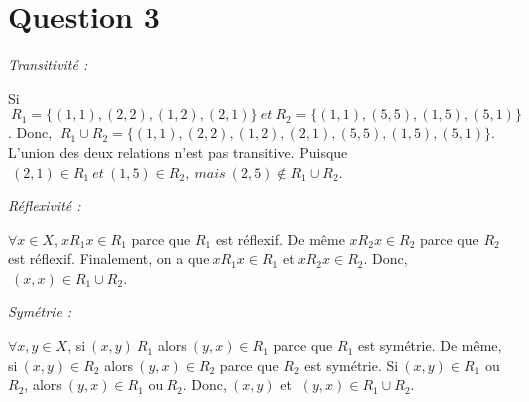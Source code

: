 \section*{Question 3}
\emph{Transitivité :}

Si$\ R_1 = \{(1,1), (2,2), (1,2), (2,1)\}\ et\ R_2 = \{(1,1), (5,5), (1,5), (5,1)\}$. Donc, $\ R_1 \cup R_2 = \{(1,1), (2,2), (1,2), (2,1), (5,5), (1,5), (5,1)\}$. L'union des  deux relations n'est pas transitive. Puisque$\ (2,1) \in R_1\ et\ (1,5) \in R_2,\ mais\ (2,5) \notin R_1 \cup R_2$.

\bigskip

\emph{Réflexivité :}

$\forall x\in X$,$\ xR_1x \in R_1$ parce que $R_1$ est réflexif. De même $xR_2x \in R_2$ parce que $R_2$ est réflexif. Finalement, on a que$\ xR_1x \in R_1$ et$\ xR_2x \in R_2$. Donc,$\ (x,x) \in R_1\cup R_2$.

\bigskip

\emph{Symétrie : }

$\forall x,y \in X$, si$\ (x,y)\ R_1$ alors$\ (y,x) \in R_1$ parce que $R_1$ est symétrie. De même, si$\ (x,y) \in R_2$ alors$\ (y,x) \in R_2$ parce que $R_2$ est symétrie. Si$\ (x, y) \in R_1$ ou $R_2$, alors$\ (y,x) \in R_1$ ou$\ R_2$. Donc,$\ (x, y)$ et
$\ (y,x) \in R_1 \cup R_2$.